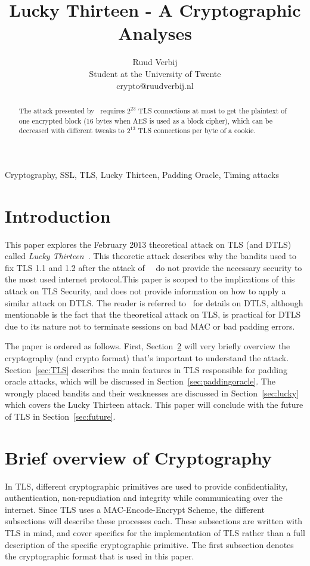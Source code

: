 \documentclass[10pt,conference,a4paper]{IEEEtran}
\title{Lucky Thirteen - A Cryptographic Analyses}
\author{Ruud Verbij \\ Student at the University of Twente \\ crypto@ruudverbij.nl}
\begin{document}
\maketitle

\begin{abstract}


The attack presented by~\citeauthor{alfardan2013lucky} requires $2^{23}$ TLS connections at most to get the plaintext of one encrypted block ($16$ bytes when AES is used as a block cipher), which can be decreased with different tweaks to $2^{13}$ TLS connections per byte of a cookie.

\end{abstract}

\begin{IEEEkeywords}
Cryptography, SSL, TLS, Lucky Thirteen, Padding Oracle, Timing attacks
\end{IEEEkeywords}

\section{Introduction}
\label{sec:intro}
This paper explores the February 2013 theoretical attack on TLS (and DTLS) called \textit{Lucky Thirteen}~\cite{alfardan2013lucky}. This theoretic attack describes why the bandits used to fix TLS 1.1 and 1.2 after the attack of~\citeauthor{canvel2003password}~\cite{canvel2003password} do not provide the necessary security to the most used internet protocol.This paper is scoped to the implications of this attack on TLS Security, and does not provide information on how to apply a similar attack on DTLS. The reader is referred to~\cite{alfardan2013lucky} for details on DTLS, although mentionable is the fact that the theoretical attack on TLS, is practical for DTLS due to its nature not to terminate sessions on bad MAC or bad padding errors.

The paper is ordered as follows. First, Section~\ref{sec:crypto} will very briefly overview the cryptography (and crypto format) that's important to understand the attack. Section~\ref{sec:TLS} describes the main features in TLS responsible for padding oracle attacks, which will be discussed in Section~\ref{sec:paddingoracle}. The wrongly placed bandits and their weaknesses are discussed in Section~\ref{sec:lucky} which covers the Lucky Thirteen attack. This paper will conclude with the future of TLS in Section~\ref{sec:future}.

\section{Brief overview of Cryptography}
\label{sec:crypto}
In TLS, different cryptographic primitives are used to provide confidentiality, authentication, non-repudiation and integrity while communicating over the internet. Since TLS uses a MAC-Encode-Encrypt Scheme, the different subsections will describe these processes each. These subsections are written with TLS in mind, and cover specifics for the implementation of TLS rather than a full description of the specific cryptographic primitive. The first subsection denotes the cryptographic format that is used in this paper.
\end{document}
